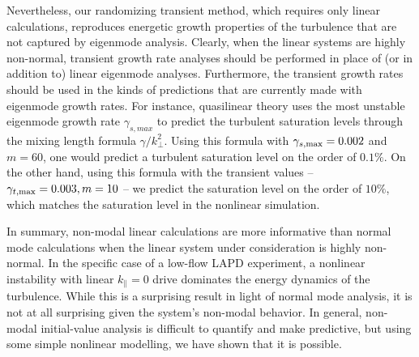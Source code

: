 \documentclass[showpacs,preprintnumbers,amsmath,amssymb,superscriptaddress,aip]{revtex4-1}
\def\para{\parallel}
\begin{document}
Nevertheless, our randomizing transient method, which requires only linear calculations, reproduces energetic growth properties of the turbulence that are not captured by eigenmode analysis.
Clearly, when the linear systems are highly non-normal, transient growth rate analyses should be performed in place of (or in addition to) linear eigenmode analyses. 
Furthermore, the transient growth rates should be used in the kinds of predictions that are currently made with eigenmode growth rates. 
For instance, quasilinear theory uses the most unstable eigenmode growth rate $\gamma_{s,max}$ to predict the turbulent saturation levels through the mixing length formula $\gamma/k_\perp^2$. 
Using this formula with $\gamma_{s,\rm{max}} = 0.002$ and $m=60$, one would predict a turbulent saturation level on the order of $0.1 \%$. 
On the other hand, using this formula with the transient values -- $\gamma_{t,\rm{max}} = 0.003, m=10$ -- we predict the saturation level on the order of $10 \%$,
which matches the saturation level in the nonlinear simulation.

In summary, non-modal linear calculations are more informative than normal mode calculations when the linear system under consideration is highly non-normal. In the specific case of a low-flow
LAPD experiment, a nonlinear instability with linear $k_\para=0$ drive dominates the energy dynamics of the turbulence. While this is a surprising result in light of normal mode analysis,
it is not at all surprising given the system's non-modal behavior. In general, non-modal initial-value analysis is difficult to quantify and make predictive, but using some simple nonlinear modelling,
we have shown that it is possible.

\begin{acknowledgments}

\end{acknowledgments}





%
\end{document}
